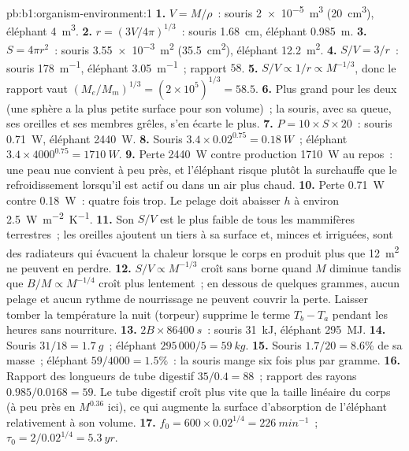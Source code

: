 \begin{solution}{pb:b1:organism-environment:1}
\textbf{1.} $V = M/\rho$~: souris \qty{2e-5}{m^3} (\qty{20}{cm^3}),
éléphant \qty{4}{m^3}.
\textbf{2.} $r = (3V/4\pi)^{1/3}$~: souris \qty{1.68}{cm}, éléphant
\qty{0.985}{m}.
\textbf{3.} $S = 4\pi r^2$~: souris \qty{3.55e-3}{m^2} (\qty{35.5}{cm^2}),
éléphant \qty{12.2}{m^2}.
\textbf{4.} $S/V = 3/r$~: souris \qty{178}{m^{-1}}, éléphant
\qty{3.05}{m^{-1}}~; rapport $58$.
\textbf{5.} $S/V \propto 1/r \propto M^{-1/3}$, donc le rapport vaut
$(M_e/M_m)^{1/3} = (2\times 10^5)^{1/3} = 58.5$.
\textbf{6.} Plus grand pour les deux (une sphère a la plus petite
surface pour son volume)~; la souris, avec sa queue, ses oreilles et ses
membres grêles, s'en écarte le plus.
\textbf{7.} $P = 10\times S\times 20$~: souris \qty{0.71}{W}, éléphant
\qty{2440}{W}.
\textbf{8.} Souris $3.4\times 0.02^{0.75} = \qty{0.18}{W}$~; éléphant
$3.4\times 4000^{0.75} = \qty{1710}{W}$.
\textbf{9.} Perte \qty{2440}{W} contre production \qty{1710}{W} au
repos~: une peau nue convient à peu près, et l'éléphant risque plutôt la
surchauffe que le refroidissement lorsqu'il est actif ou dans un air
plus chaud.
\textbf{10.} Perte \qty{0.71}{W} contre \qty{0.18}{W}~: quatre fois
trop. Le pelage doit abaisser $h$ à environ \qty{2.5}{W.m^{-2}.K^{-1}}.
\textbf{11.} Son $S/V$ est le plus faible de tous les mammifères
terrestres~; les oreilles ajoutent un tiers à sa surface et, minces et
irriguées, sont des radiateurs qui évacuent la chaleur lorsque le corps
en produit plus que \qty{12}{m^2} ne peuvent en perdre.
\textbf{12.} $S/V \propto M^{-1/3}$ croît sans borne quand $M$ diminue
tandis que $B/M \propto M^{-1/4}$ croît plus lentement~; en dessous de
quelques grammes, aucun pelage et aucun rythme de nourrissage ne peuvent
couvrir la perte. Laisser tomber la température la nuit (torpeur)
supprime le terme $T_b - T_a$ pendant les heures sans nourriture.
\textbf{13.} $2B\times\qty{86400}{s}$~: souris \qty{31}{kJ}, éléphant
\qty{295}{MJ}.
\textbf{14.} Souris $31/18 = \qty{1.7}{g}$~; éléphant
$295\,000/5 = \qty{59}{kg}$.
\textbf{15.} Souris $1.7/20 = 8.6\%$ de sa masse~; éléphant $59/4000 =
1.5\%$~: la souris mange six fois plus par gramme.
\textbf{16.} Rapport des longueurs de tube digestif $35/0.4 = 88$~;
rapport des rayons $0.985/0.0168
= 59$. Le tube digestif croît plus vite que la taille linéaire du corps
(à peu près en $M^{0.36}$ ici), ce qui augmente la surface d'absorption
de l'éléphant relativement à son volume.
\textbf{17.} $f_0 = 600\times 0.02^{1/4} = \qty{226}{min^{-1}}$~;
$\tau_0 = 2/0.02^{1/4} = \qty{5.3}{yr}$.

\end{solution}
